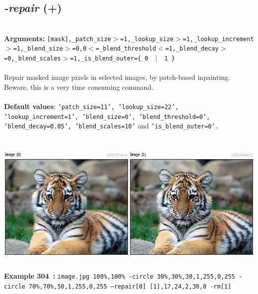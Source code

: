 \documentclass[a4paper,11pt,twoside]{book}
\begin{document}
\subsection{\emph{-repair} (+)}\vspace*{-0.5em}
~\\\textbf{Arguments: } 
{\small \texttt{[mask],\_patch\_size$>$=1,\_lookup\_size$>$=1,\_lookup\_increment$>$=1,\_blend\_size$>$=0,0$<$=\_blend\_threshold$<$=1,\_blend\_decay$>$=0,\_blend\_scales$>$=1,\_is\_blend\_outer=\{ 0 ~$|$~ 1 \}}}\\~\\
Repair masked image pixels in selected images, by patch-based inpainting.
~\\Beware, this is a very time consuming command.
~\\~\\\textbf{Default values}: {\small \texttt{'patch\_size=11', 'lookup\_size=22', 'lookup\_increment=1', 'blend\_size=0', 'blend\_threshold=0', 'blend\_decay=0.05', 'blend\_scales=10'} and \texttt{'is\_blend\_outer=0'.}}
\begin{center}\includegraphics[keepaspectratio=true,height=7cm,width=\textwidth]{img/gmic_def304.jpg}\\
{\footnotesize \textbf{Example 304~:} \texttt{image.jpg 100\%,100\% -circle 30\%,30\%,30,1,255,0,255 -circle 70\%,70\%,50,1,255,0,255 --repair[0] [1],17,24,2,30,0 -rm[1]}}
\end{center}
\end{document}
